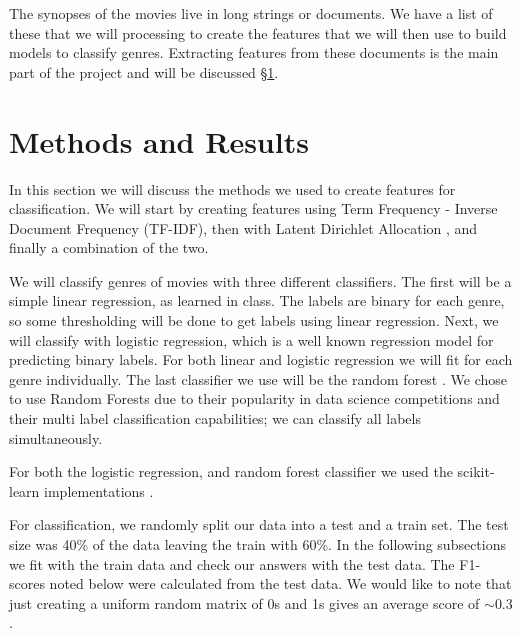 \documentclass[11pt]{article}
\begin{document}


The synopses of the movies live in long strings or documents. We have a list of these that we will processing to create the features that we will then use to build models to classify genres. Extracting features from these documents is the main part of the project and will be discussed \S \ref{sec:methods}.

\section{Methods and Results}
\label{sec:methods}

In this section we will discuss the methods we used to create features for classification. We will start by creating features using Term Frequency - Inverse Document Frequency (TF-IDF), then with Latent Dirichlet Allocation \cite{blei2003}, and finally a combination of the two. 

We will classify genres of movies with three different classifiers. The first will be a simple linear regression, as learned in class. The labels are binary for each genre, so some thresholding will be done to get labels using linear regression. Next, we will classify with logistic regression, which is a well known regression model for predicting binary labels. For both linear and logistic regression we will fit for each genre individually. The last classifier we use will be the random forest \cite{breiman2001}. We chose to use Random Forests due to their popularity in data science competitions and their multi label classification capabilities; we can classify all labels simultaneously. 

For both the logistic regression, and random forest classifier we used the scikit-learn implementations \cite{scikit-learn}.

For classification, we randomly split our data into a test and a train set. The test size was 40\% of the data leaving the train with 60\%. In the following subsections we fit with the train data and check our answers with the test data. The F1-scores noted below were calculated from the test data. We would like to note that just creating a uniform random matrix of 0s and 1s gives an average score of $\sim0.3$.
\end{document}
